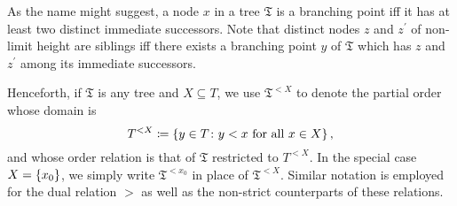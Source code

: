 As the name might suggest, a node $x$ in a tree $\mathfrak{T}$ is a branching
point iff it has at least two distinct immediate successors.  Note that distinct
nodes $z$ and $z^{\prime}$ of non-limit height are siblings iff there exists a
branching point $y$ of $\mathfrak{T}$ which has $z$ and $z^{\prime}$ among its
immediate successors.

Henceforth, if $\mathfrak{T}$ is any tree and $X\subseteq T$, we use
$\mathfrak{T}^{<X}$ to denote the partial order whose domain is
\begin{equation}
	T^{<X}\coloneqq\left\lbrace y\in T\colon y<x\text{ for all }x\in X \right\rbrace,
\end{equation}
and whose order relation is that of $\mathfrak{T}$ restricted to $T^{<X}$.  In
the special case $X=\left\lbrace x_{0}\right\rbrace$, we simply write $\mathfrak{T}^{<x_{0}}$
in place of $\mathfrak{T}^{<X}$.  Similar notation is employed for the dual
relation $>$ as well as the non-strict counterparts of these relations.

